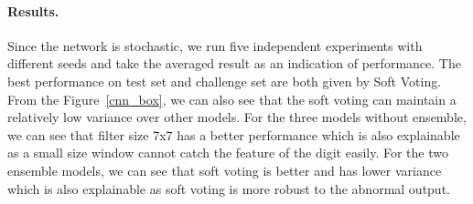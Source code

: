 \documentclass{article}
\begin{document}
\paragraph{Results. }
Since the network is stochastic, we run five independent experiments with different seeds and take the averaged result as an indication of performance. The best performance on test set and challenge set are both given by Soft Voting. From the Figure~\ref{cnn_box}, we can also see that the soft voting can maintain a relatively low variance over other models. For the three models without ensemble, we can see that filter size 7x7 has a better performance which is also explainable as a small size window cannot catch the feature of the digit easily.  For the two ensemble models, we can see that soft voting is better and has lower variance which is also explainable as soft voting is more robust to the abnormal output.
\end{document}
